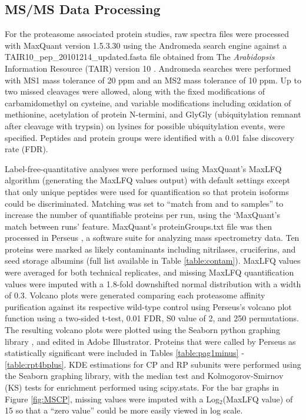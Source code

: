 \subsection{MS/MS Data Processing}
For the proteasome associated protein studies, raw spectra files were processed with MaxQuant version 1.5.3.30 \citep{cox08} using the Andromeda search engine against a TAIR10\_pep\_20101214\_updated.fasta file obtained from The \textit{Arabidopsis} Information Resource (TAIR) version 10 \citep{berardini15}. Andromeda searches were performed with MS1 mass tolerance of 20 ppm and an MS2 mass tolerance of 10 ppm. Up to two missed cleavages were allowed, along with the fixed modifications of carbamidomethyl on cysteine, and variable modifications including oxidation of methionine, acetylation of protein N-termini, and GlyGly (ubiquitylation remnant after cleavage with trypsin) on lysines for possible ubiquitylation events, were specified. Peptides and protein groups were identified with a 0.01 false discovery rate (FDR).
 
Label-free-quantitative analyses were performed using MaxQuant's MaxLFQ \citep{cox14} algorithm (generating the MaxLFQ values output) with default settings except that only unique peptides were used for quantification so that protein isoforms could be discriminated.  Matching was set to ``match from and to samples'' to increase the number of quantifiable proteins per run, using the `MaxQuant's match between runs' feature. MaxQuant's proteinGroups.txt file was then processed in Perseus \citep{tyanova16}, a software suite for analyzing mass spectrometry data. Ten proteins were marked as likely contaminants including nitrilases, cruciferins, and seed storage albumins (full list available in Table \ref{table:contam}). MaxLFQ values were averaged for both technical replicates, and missing MaxLFQ quantification values were imputed with a 1.8-fold downshifted normal distribution with a width of 0.3. Volcano plots were generated comparing each proteasome affinity purification against its respective wild-type control using Perseus's volcano plot function using a two-sided t-test, 0.01 FDR, S0 value of 2, and 250 permutations. The resulting volcano plots were plotted using the Seaborn python graphing library \citep{tyanova16, waskom16}, and edited in Adobe Illustrator. Proteins that were called by Perseus as statistically significant were included in Tables \ref{table:pag1minus} -\ref{table:rpt4bplus}. KDE estimations for CP and RP subunits were performed using the Seaborn graphing library, with the median test and Kolmogorov-Smirnov (KS) tests for enrichment performed using scipy.stats. For the bar graphs in Figure \ref{fig:MSCP}, missing values were imputed with a Log$_{2}$(MaxLFQ value) of 15 so that a ``zero value'' could be more easily viewed in log scale.

